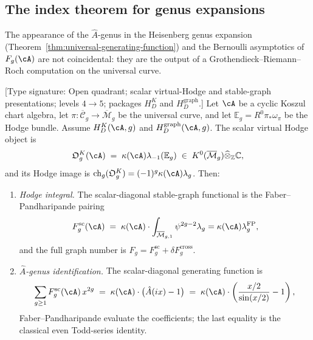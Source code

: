 \subsection{The index theorem for genus expansions}

The appearance of the $\hat{A}$-genus in the Heisenberg genus
expansion (Theorem~\ref{thm:universal-generating-function})
and the Bernoulli asymptotics of $F_g(\cA)$ are not coincidental:
they are the output of a Grothendieck--Riemann--Roch computation
on the universal curve.

\begin{theorem}\label{thm:family-index}
\textup{[Type signature: Open quadrant; scalar virtual-Hodge and
stable-graph presentations; levels $4\to5$; packages
$H_D^K$ and $H_D^{\mathrm{graph}}$.]}
Let $\cA$ be a cyclic Koszul chart algebra, let
$\pi \colon \overline{\mathcal{C}}_g \to
\overline{\mathcal{M}}_g$ be the universal curve, and let
$\mathbb{E}_g = R^0\pi_*\omega_\pi$ be the Hodge bundle.  Assume
$H_D^K(\cA,g)$ and $H_D^{\mathrm{graph}}(\cA,g)$.  The scalar virtual
Hodge object is
\begin{equation}\label{eq:modular-deformation-complex-concordance}
\mathfrak O_g^K(\cA)
\;=\;
\kappa(\cA)\lambda_{-1}(\mathbb E_g)
\;\in\; K^0(\overline{\mathcal{M}}_g) \widehat\otimes_{\mathbb{Z}} \mathbb{C},
\end{equation}
and its Hodge image is
$\operatorname{ch}_g(\mathfrak O_g^K)
=(-1)^g\kappa(\cA)\lambda_g$.  Then:
\begin{enumerate}[label=\textup{(\roman*)}]
\item \emph{Hodge integral.}
The scalar-diagonal stable-graph functional is the
Faber--Pandharipande pairing
\begin{equation}\label{eq:family-index-grr}
F_g^{\mathrm{sc}}(\cA)
\;=\;
\kappa(\cA) \cdot
\int_{\overline{\mathcal{M}}_{g,1}}
\psi^{2g-2}\lambda_g
=\kappa(\cA)\lambda_g^{\mathrm{FP}},
\end{equation}
and the full graph number is
$F_g=F_g^{\mathrm{sc}}+\delta F_g^{\mathrm{cross}}$.

\item \emph{$\hat{A}$-genus identification.}
The scalar-diagonal generating function is
\begin{equation}\label{eq:family-index-generating}
\sum_{g \geq 1} F_g^{\mathrm{sc}}(\cA)\, x^{2g}
\;=\;
\kappa(\cA) \cdot \bigl(\hat{A}(ix) - 1\bigr)
\;=\;
\kappa(\cA) \cdot
\left(\frac{x/2}{\sin(x/2)} - 1\right),
\end{equation}
Faber--Pandharipande evaluate the coefficients; the last equality is
the classical even Todd-series identity.


\end{enumerate}
\end{theorem}
